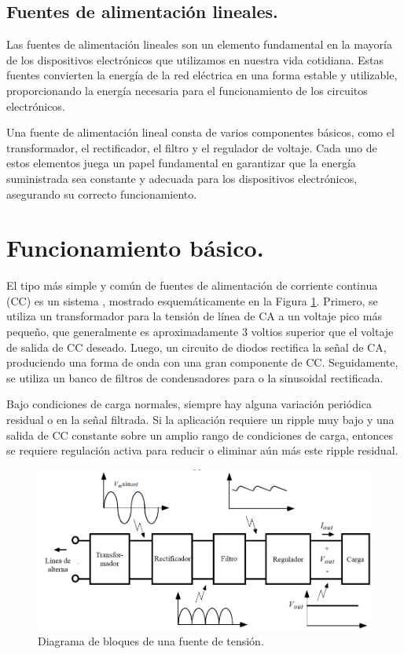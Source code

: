\subsection{Fuentes de alimentación lineales.} \par 
Las fuentes de alimentación lineales son un elemento fundamental en la mayoría de los dispositivos electrónicos que utilizamos en nuestra vida cotidiana. Estas fuentes convierten la energía de la red eléctrica en una forma estable y utilizable, proporcionando la energía necesaria para el funcionamiento de los circuitos electrónicos. \par
Una fuente de alimentación lineal consta de varios componentes básicos, como el transformador, el rectificador, el filtro y el regulador de voltaje. Cada uno de estos elementos juega un papel fundamental en garantizar que la energía suministrada sea constante y adecuada para los dispositivos electrónicos, asegurando su correcto funcionamiento.

\section{Funcionamiento básico.} \par 
El tipo más simple y común de fuentes de alimentación de corriente continua (CC) es un sistema , mostrado esquemáticamente en la Figura \ref{F:componentesFL}. Primero, se utiliza un transformador para  la tensión de línea de CA a un voltaje pico más pequeño, que generalmente es aproximadamente 3 voltios superior que el voltaje de salida de CC deseado. Luego, un circuito de diodos rectifica la señal de CA, produciendo una forma de onda con una gran componente de CC. Seguidamente, se utiliza un banco de filtros de condensadores para  o  la sinusoidal rectificada. \par 
Bajo condiciones de carga normales, siempre hay alguna variación periódica residual o  en la señal filtrada. Si la aplicación requiere un ripple muy bajo y una salida de CC constante sobre un amplio rango de condiciones de carga, entonces se requiere regulación activa para reducir o eliminar aún más este ripple residual. \cite{tektronix_pws4305}
\begin{figure}
    \centering
    \includegraphics[scale=0.5]{./imagenes/componentesFL.jpg}
    \caption{Diagrama de bloques de una fuente de tensión.}
    \label{F:componentesFL}
\end{figure}

